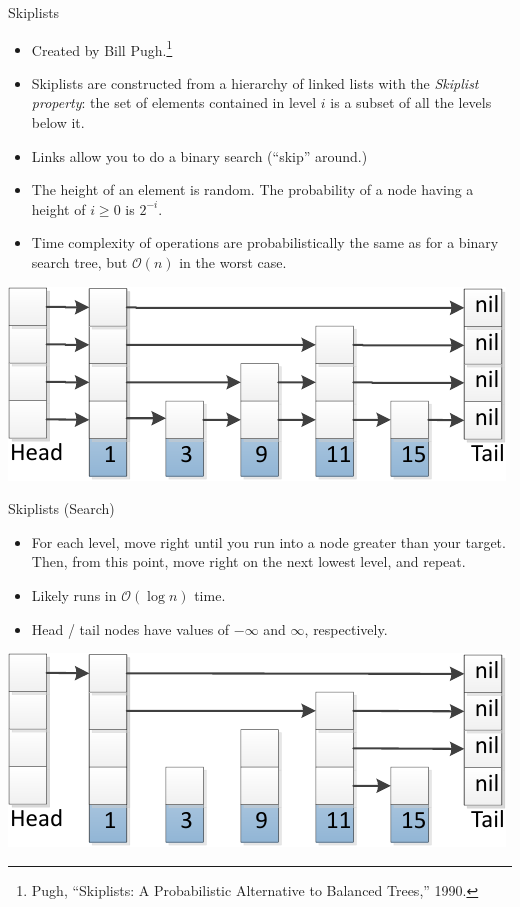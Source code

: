 \documentclass{beamer}
\begin{document}
\begin{frame}{Skiplists}
  \vspace{-0.2cm}
  \begin{itemize}
    \item Created by Bill Pugh.\footnote{Pugh, ``Skiplists: A Probabilistic Alternative to Balanced Trees,'' 1990.}
    \item Skiplists are constructed from a hierarchy of linked lists with the \textit{Skiplist property}:
      the set of elements contained in level $i$ is a subset of all the levels below it.
    \item Links allow you to do a binary search (``skip'' around.)
    \item The height of an element is random. The probability of
      a node having a height of $i \geq 0$ is $2^{-i}$.
    \item Time complexity of operations are probabilistically the same as for a binary search tree, but
      $\mathcal{O}(n)$ in the worst case.
  \end{itemize}
  \begin{center}
    \includegraphics[scale=0.75]{img/skiplist-crop.pdf}
  \end{center}
\end{frame}

\begin{frame}{Skiplists (Search)}
  \begin{itemize}
    \item For each level, move right until you run into a node greater than your target. Then, from
      this point, move right on the next lowest level, and repeat.
    \item Likely runs in $\mathcal{O}(\log n)$ time.
    \item Head / tail nodes have values of $-\infty$ and $\infty$, respectively.
  \end{itemize}
  \begin{center}
    \includegraphics[scale=0.75]{img/skiplistSearch15-crop.pdf}
  \end{center}
\end{frame}
\end{document}
